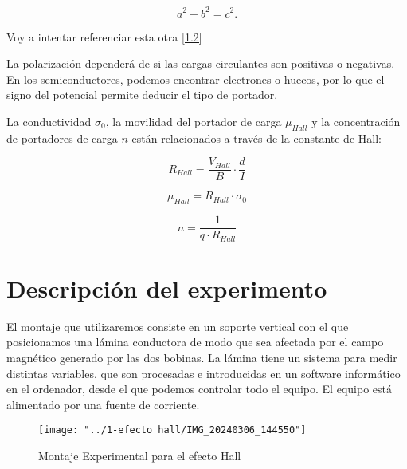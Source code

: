 \begin{equation} \label{1.2}
a^2 + b^2 = c^2 .
\end{equation}

Voy a intentar referenciar esta otra \eqref{1.2}
\fi



La polarización dependerá de si las cargas circulantes son positivas o negativas. En los semiconductores, podemos encontrar electrones o huecos, por lo que el signo del potencial permite deducir el tipo de portador. 

La conductividad $\sigma_0$, la movilidad del portador de carga $\mu_{Hall}$ y la concentración de portadores de carga $n$ están relacionados a través de la constante de Hall:

\begin{equation}\label{eq:Rhall}
R_{Hall} = \frac{V_{Hall}}{B} \cdot \frac{d}{I} 
\end{equation}


\begin{equation}\label{eq:muhall}
\mu_{Hall} = R_{Hall}\cdot \sigma_0
\end{equation}

\begin{equation}\label{eq:nconcportadores}
n = \frac{1}{q\cdot R_{Hall}}
\end{equation}





\section{Descripción del experimento}


El montaje que utilizaremos consiste en un soporte vertical con el que posicionamos una lámina conductora de modo que sea afectada por el campo magnético generado por las dos bobinas. La lámina tiene un sistema para medir distintas variables, que son procesadas e introducidas en un software informático en el ordenador, desde el que podemos controlar todo el equipo. El equipo está alimentado por una fuente de corriente.

\begin{figure}[H]
	\centering
	\texttt{[image: "../1-efecto hall/IMG\_20240306\_144550"]}
	\caption{Montaje Experimental para el efecto Hall}
	\label{fig:img20240306144550}
\end{figure}




